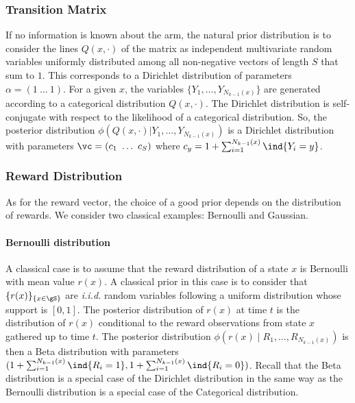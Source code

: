 \begin{subappendices}
\subsubsection{Transition Matrix}
If no information is known about the arm, the natural prior distribution is to consider the lines $Q(x,\cdot)$ of the matrix as independent multivariate random variables uniformly distributed among all non-negative vectors of length $S$ that sum to $1$. 
This corresponds to a Dirichlet distribution of parameters $\alpha=(1\ \dots\ 1)$. 
For a given $x$, the variables $\{Y_1,\dots,Y_{N_{k-1}(x)}\}$ are generated according to a categorical distribution $Q(x,\cdot)$. 
The Dirichlet distribution is self-conjugate with respect to the likelihood of a categorical distribution. 
So, the posterior distribution $\phi(Q(x,\cdot)| Y_1,\dots,Y_{N_{k-1}(x)})$ is a Dirichlet distribution with parameters $\vc=(c_1\ \dots\ c_S)$ where $c_y=1+\sum_{i=1}^{N_{k-1}(x)}\ind{Y_i=y}$.

\subsubsection{Reward Distribution}
\label{apx:reward_post}

As for the reward vector, the choice of a good prior depends on the distribution of rewards. 
We consider two classical examples: Bernoulli and Gaussian.

\paragraph{Bernoulli distribution}
A classical case is to assume that the reward distribution of a state $x$ is Bernoulli with mean value $r(x)$.
A classical prior in this case is to consider that $\{r(x)\}_{\{x\in\gS\}}$ are \emph{i.i.d.} random variables following a uniform distribution whose support is $[0,1]$. 
The posterior distribution of $r(x)$ at time $t$ is the distribution of $r(x)$ conditional to the reward observations from state $x$ gathered up to time $t$. 
The posterior distribution $\phi(r(x)\mid R_1,\dots,R_{N_{k-1}(x)})$ is then a Beta distribution with parameters $(1+\sum_{i=1}^{N_{k-1}(x)}\ind{R_i=1}, 1+\sum_{i=1}^{N_{k-1}(x)}\ind{R_i=0})$. 
Recall that the Beta distribution is a special case of the Dirichlet distribution in the same way as the Bernoulli distribution is a special case of the Categorical distribution. 


\end{subappendices}
